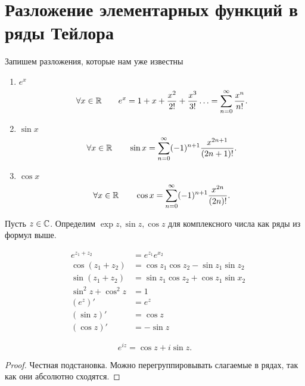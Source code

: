 \section{Разложение элементарных функций в ряды Тейлора}
Запишем разложения, которые нам уже известны
\begin{enumerate}
    \item $ e^{x}$
		\[
			\forall x \in \mathbb{R} \qquad e^{x} = 1 + x + \frac{x^2}{2!} + \frac{x^3}{3!}\ldots = \sum_{n=0}^{\infty} \frac{x^{n}}{n!}
    .\] 
\item $ \sin x$ 
	\[
		\forall x \in \mathbb{R} \qquad \sin x = \sum_{n=0}^{\infty} (-1)^{n+1} \frac{x^{2n+1}}{(2n+1)!}
	.\] 
\item $ \cos x$ 
	\[
		\forall x \in \mathbb{R} \qquad \cos x =\sum_{n=0}^{\infty} (-1)^{n+1} \frac{x^{2n}}{(2n)!}
	.\] 
\end{enumerate} 
\begin{defn}
    Пусть $ z \in \mathbb{C}$. Определим $ \exp z, \sin z, \cos z$ для комплексного числа как ряды из формул выше.
\end{defn}
\begin{prac}
    \[
    \begin{aligned}
		&e^{z_1 + z_2}  &= e^{z_1} e^{x_2} \\
		&\cos(z_1 + z_2) &= \cos z_1 \cos z_2 - \sin z_1 \sin z_2 \\
		&\sin (z_1 + z_2) &= \sin z_1 \cos z_2 + \cos z_1 \sin x_2 \\
		&\sin ^2 z + \cos^2 z &= 1 \\
		&(e ^{z})' &= e^{z} \\
		&(\sin z)' &= \cos z \\
		&(\cos z)' &= - \sin z
    \end{aligned}
    \] 
\end{prac}
\begin{thm}
    \[
    e^{iz} = \cos z + i \sin z
    .\] 
\end{thm}
\begin{proof}
    Честная подстановка. Можно перегруппировывать слагаемые в рядах, так как они абсолютно сходятся.
\end{proof}
